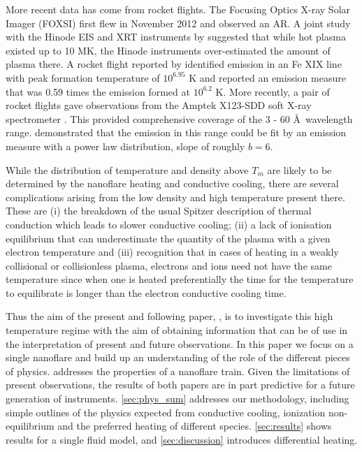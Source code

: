 \documentclass[apj]{emulateapj}
\newcommand{\ang}{\AA~}
\begin{document}
%
	\par More recent data has come from rocket flights. The Focusing Optics X-ray Solar Imager (FOXSI) \citep{krucker_focusing_2011} first flew in November 2012 and observed an AR. A joint study with the Hinode EIS and XRT instruments by \citet{ishikawa_constraining_2014} suggested that while hot plasma existed up to 10 MK, the Hinode instruments over-estimated the amount of plasma there. A rocket flight reported by \citet{brosius_pervasive_2014} identified emission in an Fe XIX line with peak formation temperature of $10^{6.95}$ K and reported an emission measure that was 0.59 times the emission formed at $10^{6.2}$ K. More recently, a pair of rocket flights gave observations from the Amptek X123-SDD soft X-ray spectrometer \citep{caspi_new_2015}. This provided comprehensive coverage of the 3 - 60 \ang wavelength range. \citeauthor{caspi_new_2015} demonstrated that the emission in this range could be fit by an emission measure with a power law distribution, slope of roughly $b = 6$. 
%
	\par While the distribution of temperature and density above $T_m$ are likely to be determined by the nanoflare heating and conductive cooling, there are several complications arising from the low density and high temperature present there. These are (i) the breakdown of the usual Spitzer description of thermal conduction which leads to slower conductive cooling; (ii) a lack of ionisation equilibrium that can underestimate the quantity of the plasma with a given electron temperature and (iii) recognition that in cases of heating in a weakly collisional or collisionless plasma, electrons and ions need not have the same temperature since when one is heated preferentially the time for the temperature to equilibrate is longer than the electron conductive cooling time.
%
	\par Thus the aim of the present and following paper, \citet[]{barnes_inference_2016-1} , is to investigate this high temperature regime with the aim of obtaining information that can be of use in the interpretation of present and future observations. In this paper we focus on a single nanoflare and build up an understanding of the role of the different pieces of physics.  addresses the properties of a nanoflare train. Given the limitations of present observations, the results of both papers are in part predictive for a future generation of instruments. \autoref{sec:phys_sum} addresses our methodology, including simple outlines of the physics expected from conductive cooling, ionization non-equilibrium and the preferred heating of different species. \autoref{sec:results} shows results for a single fluid model, and \autoref{sec:discussion} introduces differential heating.
	
\end{document}

